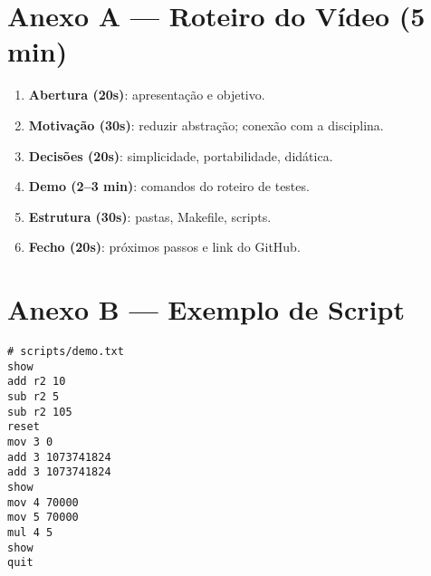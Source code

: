 \documentclass[12pt,a4paper]{article}
\begin{document}
\appendix
\section*{Anexo A — Roteiro do Vídeo (5 min)}
\begin{enumerate}[label=\arabic*.]
  \item \textbf{Abertura (20s)}: apresentação e objetivo.
  \item \textbf{Motivação (30s)}: reduzir abstração; conexão com a disciplina.
  \item \textbf{Decisões (20s)}: simplicidade, portabilidade, didática.
  \item \textbf{Demo (2--3 min)}: comandos do roteiro de testes.
  \item \textbf{Estrutura (30s)}: pastas, Makefile, scripts.
  \item \textbf{Fecho (20s)}: próximos passos e link do GitHub.
\end{enumerate}

\section*{Anexo B — Exemplo de Script}
\begin{lstlisting}
# scripts/demo.txt
show
add r2 10
sub r2 5
sub r2 105
reset
mov 3 0
add 3 1073741824
add 3 1073741824
show
mov 4 70000
mov 5 70000
mul 4 5
show
quit
\end{lstlisting}
\end{document}
